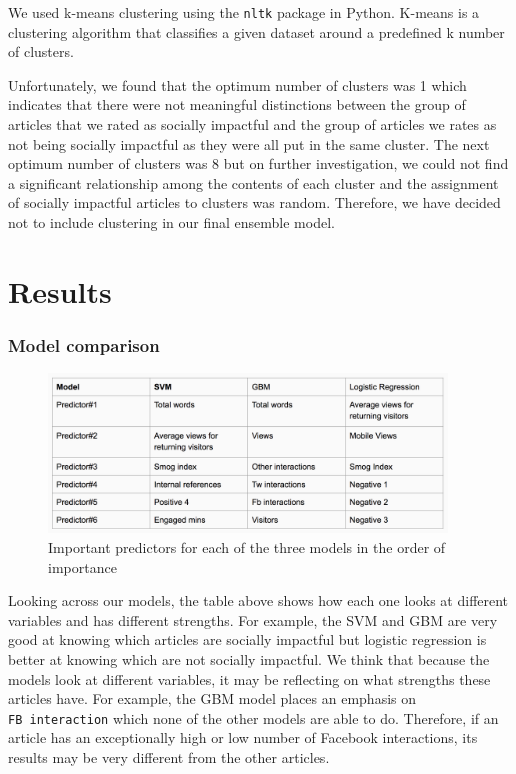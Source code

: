 \documentclass[10pt,letterpaper]{article}
\begin{document}
We used k-means clustering using the \texttt{nltk} package in Python.
K-means is a clustering algorithm that classifies a given dataset around
a predefined k number of clusters.

Unfortunately, we found that the optimum number of clusters was 1 which
indicates that there were not meaningful distinctions between the group
of articles that we rated as socially impactful and the group of
articles we rates as not being socially impactful as they were all put
in the same cluster. The next optimum number of clusters was 8 but on
further investigation, we could not find a significant relationship
among the contents of each cluster and the assignment of socially
impactful articles to clusters was random. Therefore, we have decided
not to include clustering in our final ensemble model.

\hypertarget{results}{%
\section{Results}\label{results}}

\hypertarget{model-comparison}{%
\subsubsection{Model comparison}\label{model-comparison}}

\begin{figure}
\includegraphics[width=400px]{model-comp-II} \caption{Important predictors for each of the three models in the order of importance}\label{fig:unnamed-chunk-7}
\end{figure}

Looking across our models, the table above shows how each one looks at
different variables and has different strengths. For example, the SVM
and GBM are very good at knowing which articles are socially impactful
but logistic regression is better at knowing which are not socially
impactful. We think that because the models look at different variables,
it may be reflecting on what strengths these articles have. For example,
the GBM model places an emphasis on \texttt{FB\ interaction} which none
of the other models are able to do. Therefore, if an article has an
exceptionally high or low number of Facebook interactions, its results
may be very different from the other articles.
\end{document}

